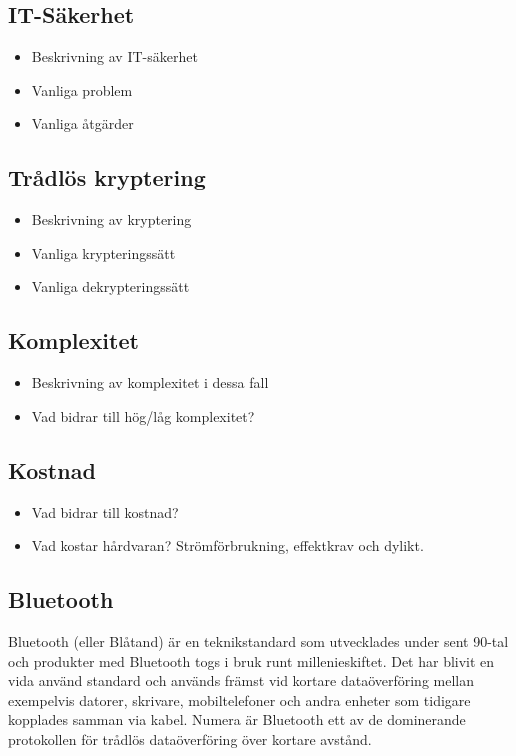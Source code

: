 \documentclass[11pt]{article}
\begin{document}
\begin{flushleft}
\cite{antenn_eb}


\subsection{IT-Säkerhet}
\begin{itemize}
\item Beskrivning av IT-säkerhet
\item Vanliga problem
\item Vanliga åtgärder
\end{itemize}

\subsection{Trådlös kryptering}
\begin{itemize}
\item Beskrivning av kryptering
\item Vanliga krypteringssätt
\item Vanliga dekrypteringssätt
\end{itemize}

\subsection{Komplexitet}
\begin{itemize}
\item Beskrivning av komplexitet i dessa fall
\item Vad bidrar till hög/låg komplexitet?
\end{itemize}

\subsection{Kostnad} 
\begin{itemize}
\item Vad bidrar till kostnad?
\item Vad kostar hårdvaran? Strömförbrukning, effektkrav och dylikt.
\end{itemize}

\subsection{Bluetooth}
Bluetooth (eller Blåtand) är en teknikstandard som utvecklades under sent 90-tal och produkter med Bluetooth togs i bruk runt millenieskiftet. Det har blivit en vida använd standard och används främst vid kortare dataöverföring mellan exempelvis datorer, skrivare, mobiltelefoner och andra enheter som tidigare kopplades samman via kabel. Numera är Bluetooth ett av de dominerande protokollen för trådlös dataöverföring över kortare avstånd. \autocite{bluetooth_eb}\autocite{bluetooth_ne} \\\bigskip


\end{flushleft}
\end{document}
